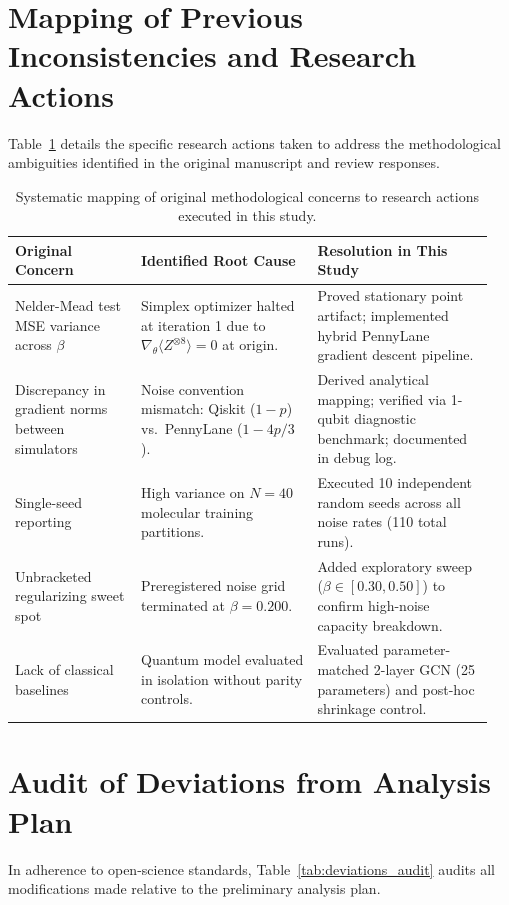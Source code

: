 \documentclass[sn-apacite,Numbered]{sn-jnl}
\begin{document}
\begin{appendices}

\section{Mapping of Previous Inconsistencies and Research Actions}\label{sec:appendix_mapping}
Table~\ref{tab:mapping_actions} details the specific research actions taken to address the methodological ambiguities identified in the original manuscript and review responses.

\begin{table}[htbp]
\centering
\caption{Systematic mapping of original methodological concerns to research actions executed in this study.}
\label{tab:mapping_actions}
\begin{tabular}{p{0.25\linewidth}p{0.35\linewidth}p{0.35\linewidth}}
\toprule
\textbf{Original Concern} & \textbf{Identified Root Cause} & \textbf{Resolution in This Study} \\
\midrule
Nelder-Mead test MSE variance across $\beta$ & Simplex optimizer halted at iteration 1 due to $\nabla_\theta \langle Z^{\otimes 8} \rangle = 0$ at origin. & Proved stationary point artifact; implemented hybrid PennyLane gradient descent pipeline. \\
\addlinespace
Discrepancy in gradient norms between simulators & Noise convention mismatch: Qiskit ($1-p$) vs.\ PennyLane ($1-4p/3$). & Derived analytical mapping; verified via 1-qubit diagnostic benchmark; documented in debug log. \\
\addlinespace
Single-seed reporting & High variance on $N=40$ molecular training partitions. & Executed 10 independent random seeds across all noise rates (110 total runs). \\
\addlinespace
Unbracketed regularizing sweet spot & Preregistered noise grid terminated at $\beta=0.200$. & Added exploratory sweep ($\beta \in [0.30, 0.50]$) to confirm high-noise capacity breakdown. \\
\addlinespace
Lack of classical baselines & Quantum model evaluated in isolation without parity controls. & Evaluated parameter-matched 2-layer GCN (25 parameters) and post-hoc shrinkage control. \\
\bottomrule
\end{tabular}
\end{table}

\section{Audit of Deviations from Analysis Plan}\label{sec:appendix_deviations}
In adherence to open-science standards, Table~\ref{tab:deviations_audit} audits all modifications made relative to the preliminary analysis plan.


\end{appendices}
\end{document}
